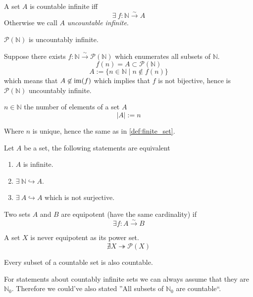 \begin{definition}
   A set \(A\) is countable infinite iff
   \[\exists~f: \mathbb{N} \xrightarrow{\sim} A\]
   Otherwise we call \(A\) \emph{uncountable infinite}.
\end{definition}
\begin{example}
   \(\mathcal{P}(\mathbb{N})\) is uncountably infinite.

   Suppose there exists \(f: \mathbb{N} \xrightarrow{\sim} \mathcal{P}(\mathbb{N})\) which enumerates all subsets of \(\mathbb{N}\).
   \[f(n) = A \subset \mathcal{P}(\mathbb{N})\]
   \[A := \{n \in \mathbb{N} \mid n \not\in f(n)\}\]
   which means that \(A \not\in \operatorname{im}(f)\) which implies that \(f\) is not bijective, hence is \(\mathcal{P}(\mathbb{N})\) uncountably infinite.
\end{example}

\begin{definition}[Cardinality]
   \(n \in \mathbb{N}\) the number of elements of a set \(A\)
   \[|A| := n \]
\end{definition}
\begin{remark}
   Where \(n\) is unique, hence the same as in \cref{def:finite_set}.
\end{remark}

\begin{proposition}
   Let \(A\) be a set, the following statements are equivalent
   \begin{enumerate}[label=\roman*, align=Center]
      \item \(A\) is infinite.
      \item \(\exists~\mathbb{N} \hookrightarrow A\).
      \item \(\exists~A \hookrightarrow A\) which is not surjective.
   \end{enumerate}
\end{proposition}

\begin{definition}
   Two sets \(A\) and \(B\) are equipotent (have the same cardinality) if
   \[\exists f: A \xrightarrow{\sim} B\]
\end{definition}

\begin{theorem}[Cantor]
   A set \(X\) is never equipotent as its power set.
   \[\nexists X \twoheadrightarrow \mathcal{P}(X)\]
\end{theorem}

\begin{proposition}
   Every subset of a countable set is also countable.
\end{proposition}
\begin{remark}
   For statements about countably infinite sets we can always assume that they are \(\mathbb{N}_0\).
   Therefore we could've also stated ''All subsets of \(\mathbb{N}_0\) are countable``.
\end{remark}


